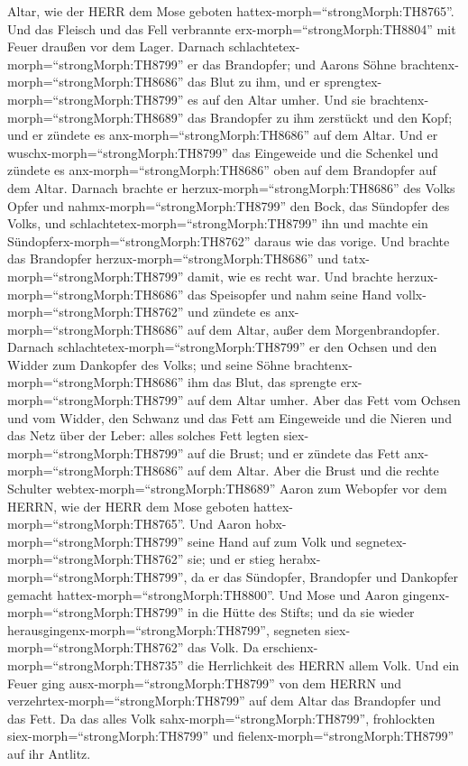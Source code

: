 Altar, wie der HERR dem Mose geboten
hattex-morph=``strongMorph:TH8765''.  Und das Fleisch und
das Fell verbrannte erx-morph=``strongMorph:TH8804'' mit Feuer draußen
vor dem Lager.  Darnach
schlachtetex-morph=``strongMorph:TH8799'' er das Brandopfer; und Aarons
Söhne brachtenx-morph=``strongMorph:TH8686'' das Blut zu ihm, und er
sprengtex-morph=``strongMorph:TH8799'' es auf den Altar umher.
 Und sie brachtenx-morph=``strongMorph:TH8689'' das
Brandopfer zu ihm zerstückt und den Kopf; und er zündete es
anx-morph=``strongMorph:TH8686'' auf dem Altar.  Und er
wuschx-morph=``strongMorph:TH8799'' das Eingeweide und die Schenkel und
zündete es anx-morph=``strongMorph:TH8686'' oben auf dem Brandopfer auf
dem Altar.  Darnach brachte er
herzux-morph=``strongMorph:TH8686'' des Volks Opfer und
nahmx-morph=``strongMorph:TH8799'' den Bock, das Sündopfer des Volks,
und schlachtetex-morph=``strongMorph:TH8799'' ihn und machte ein
Sündopferx-morph=``strongMorph:TH8762'' daraus wie das vorige.
 Und brachte das Brandopfer
herzux-morph=``strongMorph:TH8686'' und
tatx-morph=``strongMorph:TH8799'' damit, wie es recht war. 
Und brachte herzux-morph=``strongMorph:TH8686'' das Speisopfer und nahm
seine Hand vollx-morph=``strongMorph:TH8762'' und zündete es
anx-morph=``strongMorph:TH8686'' auf dem Altar, außer dem
Morgenbrandopfer.  Darnach
schlachtetex-morph=``strongMorph:TH8799'' er den Ochsen und den Widder
zum Dankopfer des Volks; und seine Söhne
brachtenx-morph=``strongMorph:TH8686'' ihm das Blut, das sprengte
erx-morph=``strongMorph:TH8799'' auf dem Altar umher.  Aber
das Fett vom Ochsen und vom Widder, den Schwanz und das Fett am
Eingeweide und die Nieren und das Netz über der Leber: 
alles solches Fett legten siex-morph=``strongMorph:TH8799'' auf die
Brust; und er zündete das Fett anx-morph=``strongMorph:TH8686'' auf dem
Altar.  Aber die Brust und die rechte Schulter
webtex-morph=``strongMorph:TH8689'' Aaron zum Webopfer vor dem HERRN,
wie der HERR dem Mose geboten hattex-morph=``strongMorph:TH8765''.
 Und Aaron hobx-morph=``strongMorph:TH8799'' seine Hand auf
zum Volk und segnetex-morph=``strongMorph:TH8762'' sie; und er stieg
herabx-morph=``strongMorph:TH8799'', da er das Sündopfer, Brandopfer und
Dankopfer gemacht hattex-morph=``strongMorph:TH8800''.  Und
Mose und Aaron gingenx-morph=``strongMorph:TH8799'' in die Hütte des
Stifts; und da sie wieder herausgingenx-morph=``strongMorph:TH8799'',
segneten siex-morph=``strongMorph:TH8762'' das Volk. Da
erschienx-morph=``strongMorph:TH8735'' die Herrlichkeit des HERRN allem
Volk.  Und ein Feuer ging ausx-morph=``strongMorph:TH8799''
von dem HERRN und verzehrtex-morph=``strongMorph:TH8799'' auf dem Altar
das Brandopfer und das Fett. Da das alles Volk
sahx-morph=``strongMorph:TH8799'', frohlockten
siex-morph=``strongMorph:TH8799'' und
fielenx-morph=``strongMorph:TH8799'' auf ihr Antlitz.

